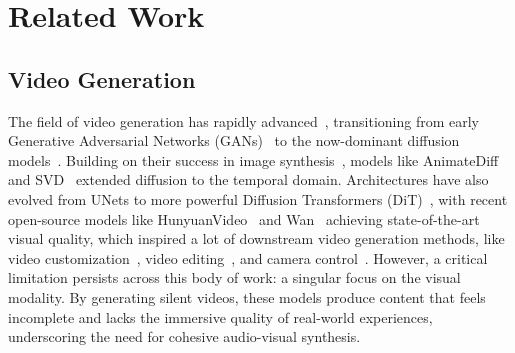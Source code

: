 \section{Related Work}
\label{sec:related_work}






\subsection{Video Generation}
The field of video generation has rapidly advanced~\cite{animatediff,hunyuanvideo,wan,hu2025ultragen,xue2025ultravideo}, transitioning from early Generative Adversarial Networks (GANs)~\cite{gan} to the now-dominant diffusion models~\cite{ddpm}. Building on their success in image synthesis~\cite{ldm, sdxl,hu2025improving}, models like AnimateDiff~\cite{animatediff} and SVD~\cite{svd} extended diffusion to the temporal domain. Architectures have also evolved from UNets to more powerful Diffusion Transformers (DiT)~\cite{cogvideox, opensoraplan}, with recent open-source models like HunyuanVideo~\cite{hunyuanvideo} and Wan~\cite{wan} achieving state-of-the-art visual quality, which inspired a lot of downstream video generation methods, like video customization~\cite{hu2025hunyuancustom,hu2025polyvivid}, video editing~\cite{liang2025omniv2v,chen2025ivebench}, and camera control~\cite{wang2024motionctrl,hu2024motionmaster,hu2025high}. However, a critical limitation persists across this body of work: a singular focus on the visual modality. By generating silent videos, these models produce content that feels incomplete and lacks the immersive quality of real-world experiences, underscoring the need for cohesive audio-visual synthesis.



